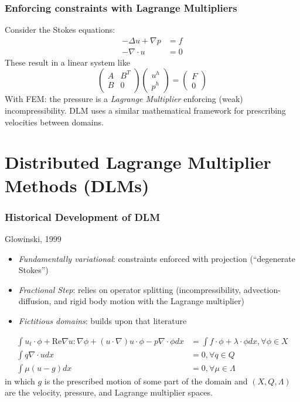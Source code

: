 \documentclass[8pt]{beamer}
\begin{document}
\begin{frame}
    \frametitle{Enforcing constraints with Lagrange Multipliers}
    Consider the Stokes equations:
    \begin{align}
      -\Delta u + \nabla p &= f \\
      -\nabla \cdot u      &= 0
    \end{align}
    These result in a linear system like
    \begin{equation}
      \begin{pmatrix}
        A & B^T \\
        B & 0 \\
      \end{pmatrix}
      \begin{pmatrix}
        u^h \\ p^h
      \end{pmatrix}
      =
      \begin{pmatrix}
        F \\ 0
      \end{pmatrix}
    \end{equation}
    With FEM: the pressure is a \emph{Lagrange Multiplier} enforcing (weak)
    incompressibility. DLM uses a similar mathematical framework for prescribing
    velocities between domains.
\end{frame}

\section{Distributed Lagrange Multiplier Methods (DLMs)}
\begin{frame}
  \frametitle{Historical Development of DLM}
  Glowinski, 1999
  \begin{itemize}
    \item \emph{Fundamentally variational}: constraints enforced with projection (``degenerate Stokes'')
    \item \emph{Fractional Step}: relies on operator splitting
      (incompressibility, advection-diffusion, and rigid body motion with the
      Lagrange multiplier)
    \item \emph{Fictitious domains}: builds upon that literature
  \end{itemize}

  \begin{align}
    \int u_t \cdot \phi + \mathrm{Re} \nabla u : \nabla \phi + (u \cdot \nabla) u \cdot \phi
    - p \nabla \cdot \phi dx
    &= \int f \cdot \phi + \lambda \cdot \phi dx, \forall \phi \in X \\
    \int q \nabla \cdot u dx &= 0, \forall q \in Q  \\
    \int \mu (u - g) dx &= 0, \forall \mu \in \Lambda
  \end{align}
  in which $g$ is the prescribed motion of some part of the domain and $(X, Q,
  \Lambda)$ are the velocity, pressure, and Lagrange multiplier spaces.
\end{frame}
\end{document}

